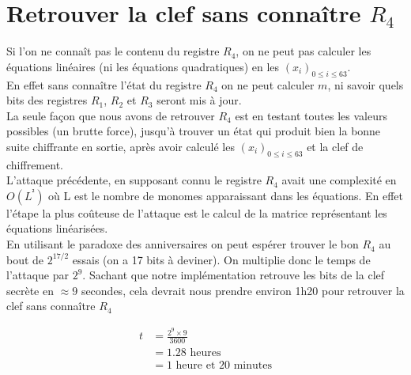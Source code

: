 \section{Retrouver la clef sans connaître $R_4$}

Si l'on ne connaît pas le contenu du registre $R_4$, on ne peut pas calculer
les équations linéaires (ni les équations quadratiques) en les $(x_i)_{0\leq i \leq 63}$. \\

En effet sans connaître l'état du registre $R_4$ on ne peut calculer $m$,
ni savoir quels bits des registres $R_1$, $R_2$ et $R_3$ seront mis à jour.\\

La seule façon que nous avons de retrouver $R_4$ est en testant toutes les valeurs possibles (un brutte force),
 jusqu'à trouver un état qui produit bien la bonne suite chiffrante en sortie, après avoir calculé
les $(x_i)_{0\leq i \leq 63}$ et la clef de chiffrement.\\

L'attaque précédente, en supposant connu le registre $R_4$ avait une complexité en $O(L^²)$
où L est le nombre de monomes apparaissant dans les équations. En effet l'étape la plus coûteuse
de l'attaque est le calcul de la matrice représentant les équations linéarisées.\\

En utilisant le paradoxe des anniversaires on peut espérer trouver le bon $R_4$ au bout de
$2^{17/2}$ essais (on a 17 bits à deviner).
On multiplie donc le temps de l'attaque par $2^{9}$. Sachant que notre implémentation retrouve les bits de la clef
secrète en $\approx 9$ secondes, cela devrait nous prendre environ 1h20 pour retrouver la clef sans connaître $R_4$

\begin{align*}
t & = \frac{2^9 \times 9}{3600}\\ 
& = 1.28 \mbox{ heures}\\
& = 1 \mbox{ heure et }20\mbox{ minutes}\\
\end{align*}

